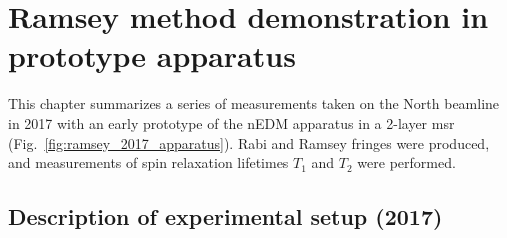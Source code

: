 
\chapter{Ramsey method demonstration in prototype apparatus}\label{chap:lanl_ramsey_demonstration}


This chapter summarizes a series of measurements taken on the North beamline in 2017 with an early prototype of the nEDM apparatus in a 2-layer \acrshort{msr} (Fig.~\ref{fig:ramsey_2017_apparatus}). Rabi and Ramsey fringes were produced, and measurements of spin relaxation lifetimes $T_1$ and $T_2$ were performed. 


\section{Description of experimental setup (2017)}



